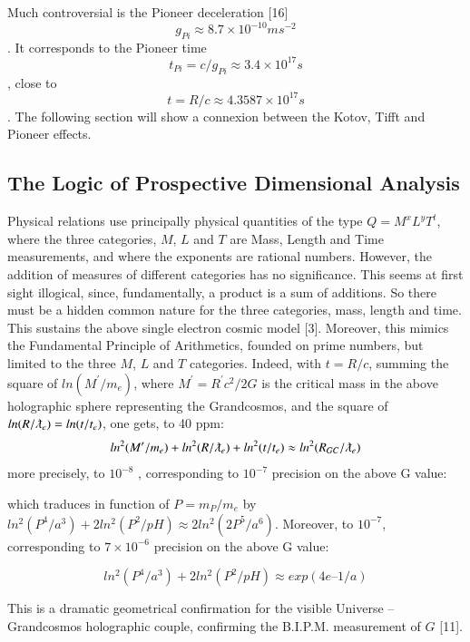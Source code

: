 \documentclass[twoside,draft]{article}
\begin{document}
\begin{sloppypar}
{Much controversial is the Pioneer deceleration [16] $$g_{Pi} \approx 8.7 \times 10^{-10} ms^{-2}$$. It corresponds to
the Pioneer time $$t_{Pi} = c/g_{Pi} \approx 3.4 \times 10^{17} s$$, close to $$t = R/c \approx 4.3587 \times 10^{17} s$$. The following section will show a connexion between the Kotov, Tifft and Pioneer effects.

\subsection{The Logic of Prospective Dimensional Analysis}

Physical relations use principally physical quantities of the type $Q = M^{x} L^{y} T^{t}$, where
the three categories, $M$, $L$ and $T$ are Mass, Length and Time measurements, and where the exponents are
rational numbers. However, the addition of measures of different categories has no significance.
This seems at first sight illogical, since, fundamentally, a product is a sum of additions. So there
must be a hidden common nature for the three categories, mass, length and time. This sustains the
above single electron cosmic model [3]. Moreover, this mimics the Fundamental Principle of
Arithmetics, founded on prime numbers, but limited to the three $M$, $L$ and $T$ categories. Indeed, with $t =
R/c$, summing the square of $ln(M^{\prime}/m_{e} )$, where $M^{\prime} = R^{\prime} c^{2} /2G$ is the critical mass in the above
holographic sphere representing the Grandcosmos, and the square of $ln(R/\lambdabar_{e} ) = ln(t/t_{e} )$, one gets, to
40 ppm:
\begin{equation}
ln^{2} (M^{\prime}/m_{e} ) + ln^{2} (R/\lambdabar_{e}) + ln^2 (t/t_{e} ) \approx ln^2 (R_{GC} /\lambdabar_{e} )
\end{equation}
more precisely, to $10^{-8}$ , corresponding to $10^{-7}$ precision on the above G value:

which traduces in function of $P = m_P/m_e$ by $ln^2(P^4/a^3) + 2 ln^2(P^2/pH) \approx 2 ln^2(2P^5/a^6)$. Moreover, to $10^{-7}$, corresponding to $7 \times 10^{-6}$ precision on the above G value:

\begin{equation}
ln^2(P^4/a^3) + 2 ln^2(P^2/pH) \approx exp(4e – 1/a)
\end{equation}
 
This is a dramatic geometrical confirmation for the visible Universe – Grandcosmos holographic couple, confirming the B.I.P.M. measurement of $G$ [11].


}
\end{sloppypar}
\end{document}
